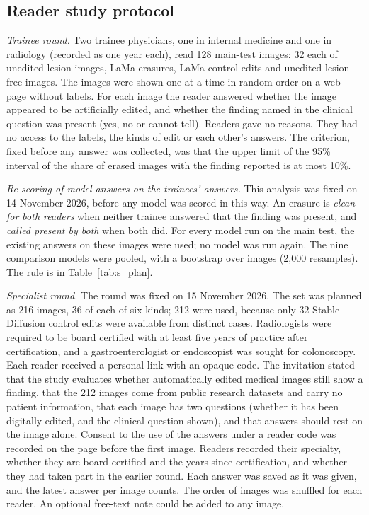 \subsection{Reader study protocol}
\label{sec:s_readers}

\emph{Trainee round.} Two trainee physicians, one in internal medicine and one in radiology (recorded as one year each), read 128 main-test images: 32 each of unedited lesion images, LaMa erasures, LaMa control edits and unedited lesion-free images. The images were shown one at a time in random order on a web page without labels. For each image the reader answered whether the image appeared to be artificially edited, and whether the finding named in the clinical question was present (yes, no or cannot tell). Readers gave no reasons. They had no access to the labels, the kinds of edit or each other's answers. The criterion, fixed before any answer was collected, was that the upper limit of the 95\% interval of the share of erased images with the finding reported is at most 10\%.

\emph{Re-scoring of model answers on the trainees' answers.} This analysis was fixed on 14 November 2026, before any model was scored in this way. An erasure is \emph{clean for both readers} when neither trainee answered that the finding was present, and \emph{called present by both} when both did. For every model run on the main test, the existing answers on these images were used; no model was run again. The nine comparison models were pooled, with a bootstrap over images (2,000 resamples). The rule is in Table~\ref{tab:s_plan}.

\emph{Specialist round.} The round was fixed on 15 November 2026. The set was planned as 216 images, 36 of each of six kinds; 212 were used, because only 32 Stable Diffusion control edits were available from distinct cases. Radiologists were required to be board certified with at least five years of practice after certification, and a gastroenterologist or endoscopist was sought for colonoscopy. Each reader received a personal link with an opaque code. The invitation stated that the study evaluates whether automatically edited medical images still show a finding, that the 212 images come from public research datasets and carry no patient information, that each image has two questions (whether it has been digitally edited, and the clinical question shown), and that answers should rest on the image alone. Consent to the use of the answers under a reader code was recorded on the page before the first image. Readers recorded their specialty, whether they are board certified and the years since certification, and whether they had taken part in the earlier round. Each answer was saved as it was given, and the latest answer per image counts. The order of images was shuffled for each reader. An optional free-text note could be added to any image.

